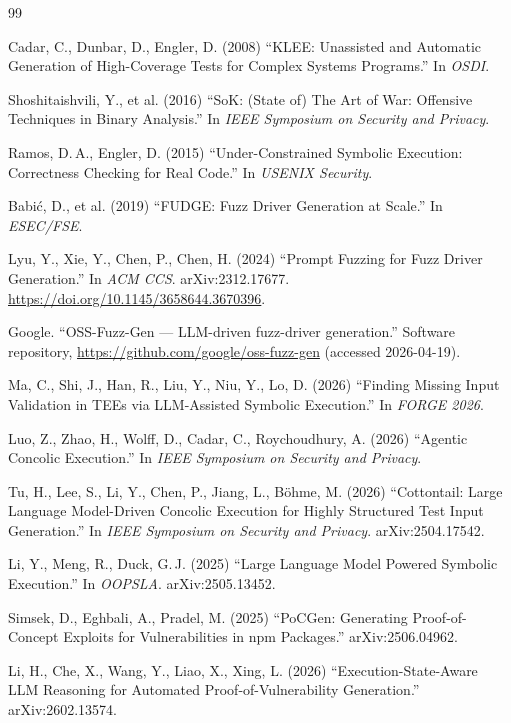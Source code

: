 \documentclass[3p,times,procedia]{elsarticle}
\begin{document}
\begin{thebibliography}{99}

 Cadar, C., Dunbar, D., Engler, D. (2008) ``KLEE: Unassisted and Automatic Generation of High-Coverage Tests for Complex Systems Programs.'' In \emph{OSDI}.

 Shoshitaishvili, Y., et al. (2016) ``SoK: (State of) The Art of War: Offensive Techniques in Binary Analysis.'' In \emph{IEEE Symposium on Security and Privacy}.

 Ramos, D.\,A., Engler, D. (2015) ``Under-Constrained Symbolic Execution: Correctness Checking for Real Code.'' In \emph{USENIX Security}.

 Babi\'{c}, D., et al. (2019) ``FUDGE: Fuzz Driver Generation at Scale.'' In \emph{ESEC/FSE}.

 Lyu, Y., Xie, Y., Chen, P., Chen, H. (2024) ``Prompt Fuzzing for Fuzz Driver Generation.'' In \emph{ACM CCS}. arXiv:2312.17677. \url{https://doi.org/10.1145/3658644.3670396}.

 Google. ``OSS-Fuzz-Gen --- LLM-driven fuzz-driver generation.'' Software repository, \url{https://github.com/google/oss-fuzz-gen} (accessed 2026-04-19).

 Ma, C., Shi, J., Han, R., Liu, Y., Niu, Y., Lo, D. (2026) ``Finding Missing Input Validation in TEEs via LLM-Assisted Symbolic Execution.'' In \emph{FORGE 2026}.

 Luo, Z., Zhao, H., Wolff, D., Cadar, C., Roychoudhury, A. (2026) ``Agentic Concolic Execution.'' In \emph{IEEE Symposium on Security and Privacy}.

 Tu, H., Lee, S., Li, Y., Chen, P., Jiang, L., B\"{o}hme, M. (2026) ``Cottontail: Large Language Model-Driven Concolic Execution for Highly Structured Test Input Generation.'' In \emph{IEEE Symposium on Security and Privacy}. arXiv:2504.17542.

 Li, Y., Meng, R., Duck, G.\,J. (2025) ``Large Language Model Powered Symbolic Execution.'' In \emph{OOPSLA}. arXiv:2505.13452.

 Simsek, D., Eghbali, A., Pradel, M. (2025) ``PoCGen: Generating Proof-of-Concept Exploits for Vulnerabilities in npm Packages.'' arXiv:2506.04962.

 Li, H., Che, X., Wang, Y., Liao, X., Xing, L. (2026) ``Execution-State-Aware LLM Reasoning for Automated Proof-of-Vulnerability Generation.'' arXiv:2602.13574.


\end{thebibliography}
\end{document}
